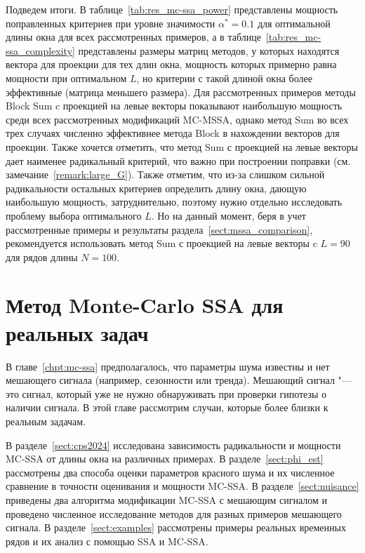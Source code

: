 \documentclass[specialist,
substylefile = spbu_report.rtx,
subf,href,colorlinks=true, 12pt]{disser}
\theoremstyle{definition}
\begin{document}
Подведем итоги. В таблице~\ref{tab:res_mc-ssa_power} представлены мощность поправленных критериев при уровне значимости $\alpha^*=0.1$ для оптимальной длины окна для всех рассмотренных примеров, а в таблице~\ref{tab:res_mc-ssa_complexity} представлены размеры матриц методов, у которых находятся вектора для проекции для тех длин окна, мощность которых примерно равна мощности при оптимальном $L$, но критерии с такой длиной окна более эффективные (матрица меньшего размера). Для рассмотренных примеров методы Block Sum c проекцией на левые векторы показывают наибольшую мощность среди всех рассмотренных модификаций MC-MSSA, однако метод Sum во всех трех случаях численно эффективнее метода Block в нахождении векторов для проекции. Также хочется отметить, что метод Sum с проекцией на левые векторы дает наименее радикальный критерий, что важно при построении поправки (см. замечание~\ref{remark:large_G}). Также отметим, что из-за слишком сильной радикальности остальных критериев определить длину окна, дающую наибольшую мощность, затруднительно, поэтому нужно отдельно исследовать проблему выбора оптимального $L$. Но на данный момент, беря в учет рассмотренные примеры и результаты раздела~\ref{sect:mssa_comparison}, рекомендуется использовать метод Sum с проекцией на левые векторы c $L=90$ для рядов длины $N=100$.


\chapter{Метод Monte-Carlo SSA для реальных задач}\label{chpt:mc_ssa_real}
В главе~\ref{chpt:mc-ssa} предполагалось, что параметры шума известны и нет мешающего сигнала (например, сезонности или тренда). Мешающий сигнал "--- это сигнал, который уже не нужно обнаруживать при проверки гипотезы о наличии сигнала.  В этой главе рассмотрим случаи, которые более близки к реальным задачам.

В разделе~\ref{sect:cps2024} исследована зависимость радикальности и мощности MC-SSA от длины окна на различных примерах. В разделе~\ref{sect:phi_est} рассмотрены два способа оценки параметров красного шума и их численное сравнение в точности оценивания и мощности MC-SSA. В разделе~\ref{sect:nuisance} приведены два алгоритма модификации MC-SSA с мешающим сигналом и проведено численное исследование методов для разных примеров мешающего сигнала. В разделе~\ref{sect:examples} рассмотрены примеры реальных временных рядов и их анализ с помощью SSA и MC-SSA.
\end{document}
